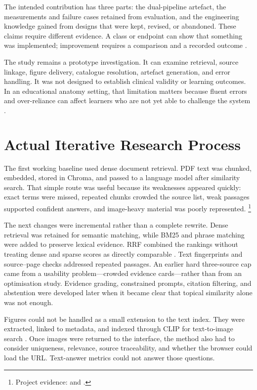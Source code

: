 The intended contribution has three parts: the dual-pipeline artefact, the measurements and failure cases retained from evaluation, and the engineering knowledge gained from designs that were kept, revised, or abandoned. These claims require different evidence. A class or endpoint can show that something was implemented; improvement requires a comparison and a recorded outcome \parencite{hevner2004,wieringa2014}.

The study remains a prototype investigation. It can examine retrieval, source linkage, figure delivery, catalogue resolution, artefact generation, and error handling. It was not designed to establish clinical validity or learning outcomes. In an educational anatomy setting, that limitation matters because fluent errors and over-reliance can affect learners who are not yet able to challenge the system \parencite{ji2023,kasneci2023}.

\section{Actual Iterative Research Process}
\label{sec:research-process}

The first working baseline used dense document retrieval. PDF text was chunked, embedded, stored in Chroma, and passed to a language model after similarity search. That simple route was useful because its weaknesses appeared quickly: exact terms were missed, repeated chunks crowded the source list, weak passages supported confident answers, and image-heavy material was poorly represented.
\footnote{Project evidence:  and .}

The next changes were incremental rather than a complete rewrite. Dense retrieval was retained for semantic matching, while BM25 and phrase matching were added to preserve lexical evidence. RRF combined the rankings without treating dense and sparse scores as directly comparable \parencite{robertson2009,cormack2009}. Text fingerprints and source--page checks addressed repeated passages. An earlier hard three-source cap came from a usability problem---crowded evidence cards---rather than from an optimisation study. Evidence grading, constrained prompts, citation filtering, and abstention were developed later when it became clear that topical similarity alone was not enough.

Figures could not be handled as a small extension to the text index. They were extracted, linked to metadata, and indexed through CLIP for text-to-image search \parencite{radford2021}. Once images were returned to the interface, the method also had to consider uniqueness, relevance, source traceability, and whether the browser could load the URL. Text-answer metrics could not answer those questions.

